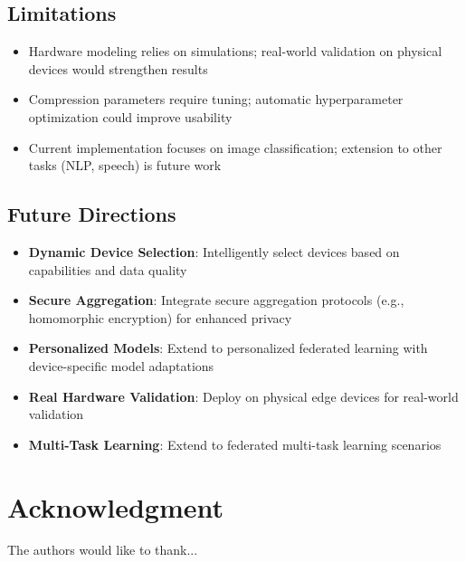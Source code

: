 \documentclass[journal]{IEEEtran}
\begin{document}
\subsection{Limitations}

\begin{itemize}
    \item Hardware modeling relies on simulations; real-world validation on physical devices would strengthen results
    \item Compression parameters require tuning; automatic hyperparameter optimization could improve usability
    \item Current implementation focuses on image classification; extension to other tasks (NLP, speech) is future work
\end{itemize}

\subsection{Future Directions}

\begin{itemize}
    \item \textbf{Dynamic Device Selection}: Intelligently select devices based on capabilities and data quality
    \item \textbf{Secure Aggregation}: Integrate secure aggregation protocols (e.g., homomorphic encryption) for enhanced privacy
    \item \textbf{Personalized Models}: Extend to personalized federated learning with device-specific model adaptations
    \item \textbf{Real Hardware Validation}: Deploy on physical edge devices for real-world validation
    \item \textbf{Multi-Task Learning}: Extend to federated multi-task learning scenarios
\end{itemize}

\section*{Acknowledgment}

The authors would like to thank...



\end{document}
